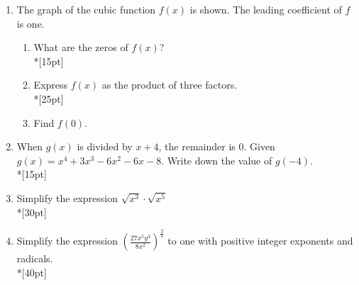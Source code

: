 \documentclass[12pt, oneside]{article}
\begin{document}
\begin{enumerate}
\newpage
\item The graph of the cubic function $f(x)$ is shown. The leading coefficient of $f$ is one.
\begin{enumerate}
    \item What are the zeros of $f(x)$?\\*[15pt]
    \item Express $f(x)$ as the product of three factors.\\*[25pt]
    \item Find $f(0)$.
\end{enumerate}
\begin{center}
\end{center}

\item When $g(x)$ is divided by $x+4$, the remainder is 0. Given $g(x)=x^4+3x^3- 6x^2- 6x-8$. Write down the value of $g(-4)$.\\*[15pt]

\item Simplify the expression $\sqrt{x^3} \cdot \sqrt{x^5}$ \\*[30pt]

\item Simplify the expression $\displaystyle \left( \frac{27x^{5}y^3}{8x^2} \right)^{\frac{2}{3}}$ to one with positive integer exponents and radicals.\\*[40pt]


\newpage


\end{enumerate}
\end{document}
